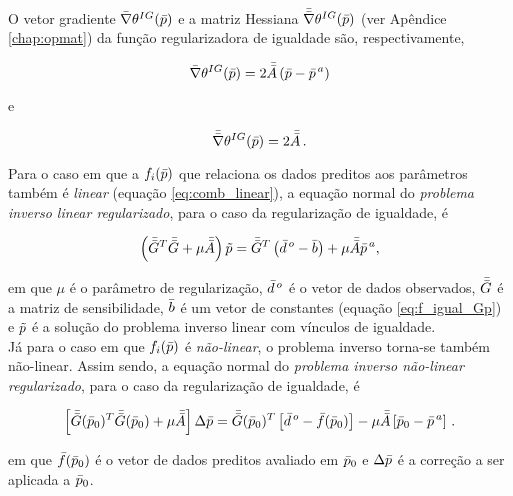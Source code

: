 \indent O vetor gradiente $\bar{\nabla}\theta^{IG}(\bar{p})$ e a matriz Hessiana
$\bar{\bar{\nabla}}\theta^{IG}(\bar{p})$ (ver Apêndice \ref{chap:opmat}) da função
regularizadora de igualdade são, respectivamente,

\begin{equation}
\bar{\nabla}\theta^{IG}(\bar{p}) = 2\bar{\bar{A}}
    \left(\bar{p} - \bar{p}^{\thinspace a} \right)
\end{equation}

\noindent e

\begin{equation}
\bar{\bar{\nabla}}\theta^{IG}(\bar{p}) = 2\bar{\bar{A}} \thinspace .
\end{equation}

\indent Para o caso em que a $f_i(\bar{p})$ que relaciona
os dados preditos aos parâmetros também é {\it linear} (equação \ref{eq:comb_linear}),
a equação normal do {\it problema inverso linear regularizado},
para o caso da regularização de igualdade, é

\begin{equation}
\left(\bar{\bar{G}}^T\bar{\bar{G}} + \mu\bar{\bar{A}}\right)\tilde{p} =
    \bar{\bar{G}}^T\left(\bar{d}^{\thinspace o} - \bar{b} \right) +
    \mu\bar{\bar{A}}\bar{p}^{\thinspace a} ,
\end{equation}

\noindent em que $\mu$ é o parâmetro de regularização, $\bar{d}^{\thinspace o}$
é o vetor de dados observados, $\bar{\bar{G}}$ é a matriz de sensibilidade, $\bar{b}$
é um vetor de constantes (equação \ref{eq:f_igual_Gp}) e $\tilde{p}$ é a solução
do problema inverso linear com vínculos de igualdade.
\\
\indent Já para o caso em que $f_i(\bar{p})$ é {\it não-linear}, o problema
inverso torna-se também não-linear. Assim sendo, a equação normal do
{\it problema inverso não-linear regularizado}, para o caso da regularização de
igualdade, é

\begin{equation}
\left[\bar{\bar{G}}(\bar{p}_0)^T\bar{\bar{G}}(\bar{p}_0) +
      \mu\bar{\bar{A}}\right]\Delta\bar{p} =
\bar{\bar{G}}(\bar{p}_0)^T \left[\bar{d}^{\thinspace o} - \bar{f}(\bar{p}_0)\right] -
\mu\bar{\bar{A}}\left[\bar{p}_0 - \bar{p}^{\thinspace a}\right]
    \thinspace .
\end{equation}

\noindent em que $\bar{f}(\bar{p}_0)$ é o vetor de dados preditos avaliado em
$\bar{p}_0$ e $\Delta\bar{p}$ é a correção a ser aplicada a $\bar{p}_0$.

